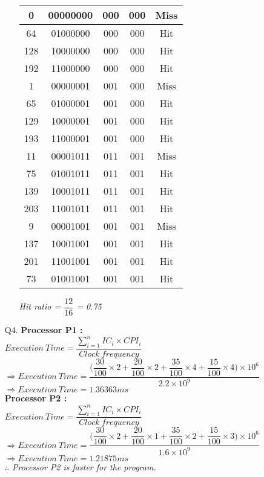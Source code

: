 \documentclass[letterpaper]{article}
\begin{document}
\begin{large}
\begin{flushleft}
\begin{enumerate}
\begin{enumerate}
\begin{table}[h]
\begin{tabular}{|c|c|c|c|c|}
\hline
0 & 00000000 & 000 & 000 & Miss\\
\hline
64 & 01000000 & 000 & 000 & Hit\\
\hline
128 & 10000000 & 000 & 000 & Hit\\
\hline
192 & 11000000 & 000 & 000 & Hit\\
\hline
1 & 00000001 & 001 & 000 & Miss\\
\hline
65 & 01000001 & 001 & 000 & Hit\\
\hline
129 & 10000001 & 001 & 000 & Hit\\
\hline
193 & 11000001 & 001 & 000 & Hit\\
\hline
11 & 00001011 & 011 & 001 & Miss\\
\hline
75 & 01001011 & 011 & 001 & Hit\\
\hline 
139 & 10001011 & 011 & 001 & Hit\\
\hline
203 & 11001011 & 011 & 001 & Hit\\
\hline
9 & 00001001 & 001 & 001 & Miss\\
\hline
137 & 10001001 & 001 & 001 & Hit\\
\hline
201 & 11001001 & 001 & 001 & Hit\\
\hline
73 & 01001001 & 001 & 001 & Hit\\
\hline
\end{tabular}
\end{table}
\begin{center}
\textit{Hit ratio = $\dfrac{12}{16}$ = 0.75}\\[0.2in]
\end{center}
\end{enumerate}

\item[Q4.]
\textbf{Processor P1 : }\\[0.1in]
\textit{$Execution\ Time = \dfrac{\sum_{i=1}^{n} IC_{i} \times CPI_{i}}{Clock\ frequency}$}\\[0.1in]
\textit{$\Rightarrow Execution\ Time = \dfrac{\Big(\dfrac{30}{100}\times 2+\dfrac{20}{100}\times 2+\dfrac{35}{100}\times 4+\dfrac{15}{100}\times 4\Big)\times 10^6}{2.2 \times 10^9} $}\\[0.1in]
\textit{$\Rightarrow Execution\ Time = 1.36363 ms$}\\[0.2in]
\textbf{Processor P2 : }\\[0.1in]
\textit{$Execution\ Time = \dfrac{\sum_{i=1}^{n} IC_{i} \times CPI_{i}}{Clock\ frequency}$}\\[0.1in]
\textit{$\Rightarrow Execution\ Time = \dfrac{\Big(\dfrac{30}{100} \times 2+\dfrac{20}{100}\times 1+\dfrac{35}{100}\times 2+\dfrac{15}{100}\times 3\Big)\times 10^6}{1.6 \times 10^9} $}\\[0.1in]
\textit{$\Rightarrow Execution\ Time = 1.21875 ms$}\\[0.1in]
\textit{$\therefore$ Processor P2 is faster for the program.}
\clearpage


\end{enumerate}
\end{flushleft}
\end{large}
\end{document}
